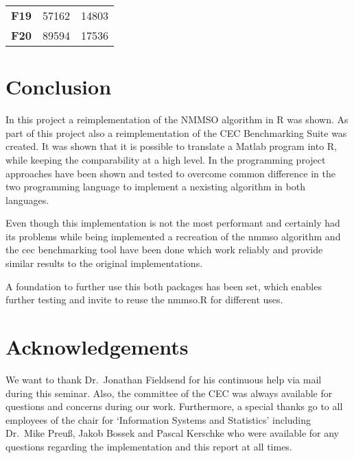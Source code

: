 \documentclass[12pt,a4paper]{article}
\begin{document}
\begin{longtable}[c]{@{}crr@{}}
\begin{minipage}[t]{0.13\columnwidth}
\textbf{F19}
\strut\end{minipage} &
\begin{minipage}[t]{0.09\columnwidth}\raggedleft\strut
57162
\strut\end{minipage} &
\begin{minipage}[t]{0.25\columnwidth}\raggedleft\strut
14803
\strut\end{minipage}\tabularnewline
\begin{minipage}[t]{0.13\columnwidth}\centering\strut
\textbf{F20}
\strut\end{minipage} &
\begin{minipage}[t]{0.09\columnwidth}\raggedleft\strut
89594
\strut\end{minipage} &
\begin{minipage}[t]{0.25\columnwidth}\raggedleft\strut
17536
\strut\end{minipage}\tabularnewline
\bottomrule
\end{longtable}

\section{Conclusion}\label{conclusion}

In this project a reimplementation of the NMMSO algorithm in R was
shown. As part of this project also a reimplementation of the CEC
Benchmarking Suite was created. It was shown that it is possible to
translate a Matlab program into R, while keeping the comparability at a
high level. In the programming project approaches have been shown and
tested to overcome common difference in the two programming language to
implement a nexisting algorithm in both languages.

Even though this implementation is not the most performant and certainly
had its problems while being implemented a recreation of the nmmso
algorithm and the cec benchmarking tool have been done which work
reliably and provide similar results to the original implementations.

A foundation to further use this both packages has been set, which
enables further testing and invite to reuse the nmmso.R for different
uses.

\section{Acknowledgements}\label{acknowledgements}

We want to thank Dr.~Jonathan Fieldsend for his continuous help via mail
during this seminar. Also, the committee of the CEC was always available
for questions and concerns during our work. Furthermore, a special
thanks go to all employees of the chair for `Information Systems and
Statistics' including Dr.~Mike Preuß, Jakob Bossek and Pascal Kerschke
who were available for any questions regarding the implementation and
this report at all times. \newpage
\end{document}
